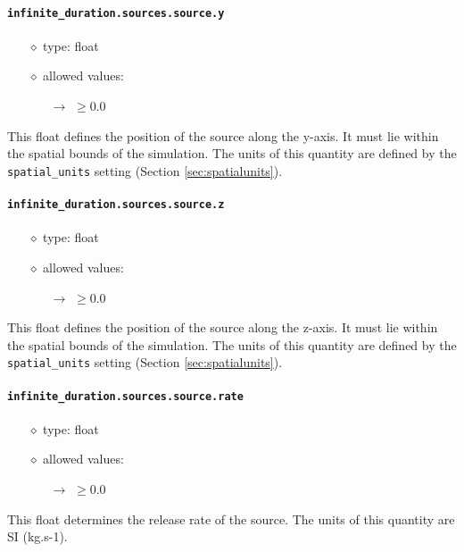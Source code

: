 \documentclass[]{article}
\def\code#1{\texttt{#1}}
\begin{document}
\paragraph{\code{infinite\_duration.sources.source.y}}\label{sec:infsourcey}
\begin{itemize}
    \item[$\diamond$] type: float 
    \item[$\diamond$] allowed values:
    \begin{itemize}
        \item[$\rightarrow$] $\geq0.0$
    \end{itemize}
\end{itemize}
This float defines the position of the source along the y-axis. It must lie
within the spatial bounds of the simulation. The units of this quantity are
defined by the \code{spatial\_units} setting (Section \ref{sec:spatialunits}).

\paragraph{\code{infinite\_duration.sources.source.z}}\label{sec:infsourcez}
\begin{itemize}
    \item[$\diamond$] type: float 
    \item[$\diamond$] allowed values:
    \begin{itemize}
        \item[$\rightarrow$] $\geq0.0$
    \end{itemize}
\end{itemize}
This float defines the position of the source along the z-axis. It must lie
within the spatial bounds of the simulation. The units of this quantity are
defined by the \code{spatial\_units} setting (Section \ref{sec:spatialunits}).

\paragraph{\code{infinite\_duration.sources.source.rate}}\label{sec:infsourcerate}
\begin{itemize}
    \item[$\diamond$] type: float 
    \item[$\diamond$] allowed values:
    \begin{itemize}
        \item[$\rightarrow$] $\geq0.0$
    \end{itemize}
\end{itemize}
This float determines the release rate of the source. The units of this quantity
are SI (kg.s-1).
\end{document}
